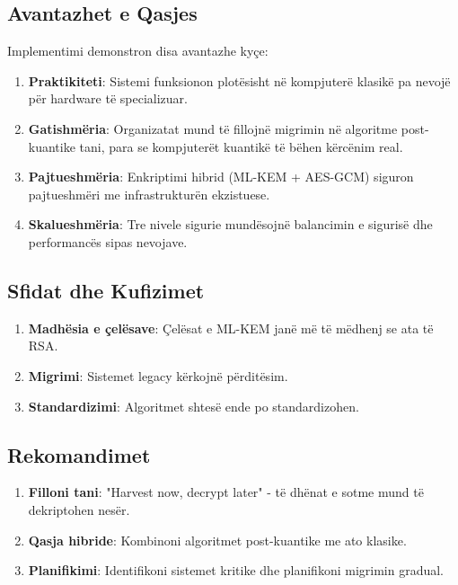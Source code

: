 \documentclass[conference]{IEEEtran}
\begin{document}
\subsection{Avantazhet e Qasjes}

Implementimi demonstron disa avantazhe kyçe:

\begin{enumerate}
\item \textbf{Praktikiteti}: Sistemi funksionon plotësisht në kompjuterë klasikë pa nevojë për hardware të specializuar.

\item \textbf{Gatishmëria}: Organizatat mund të fillojnë migrimin në algoritme post-kuantike tani, para se kompjuterët kuantikë të bëhen kërcënim real.

\item \textbf{Pajtueshmëria}: Enkriptimi hibrid (ML-KEM + AES-GCM) siguron pajtueshmëri me infrastrukturën ekzistuese.

\item \textbf{Skalueshmëria}: Tre nivele sigurie mundësojnë balancimin e sigurisë dhe performancës sipas nevojave.
\end{enumerate}

\subsection{Sfidat dhe Kufizimet}

\begin{enumerate}
\item \textbf{Madhësia e çelësave}: Çelësat e ML-KEM janë më të mëdhenj se ata të RSA.
\item \textbf{Migrimi}: Sistemet legacy kërkojnë përditësim.
\item \textbf{Standardizimi}: Algoritmet shtesë ende po standardizohen.
\end{enumerate}

\subsection{Rekomandimet}

\begin{enumerate}
\item \textbf{Filloni tani}: "Harvest now, decrypt later" - të dhënat e sotme mund të dekriptohen nesër.
\item \textbf{Qasja hibride}: Kombinoni algoritmet post-kuantike me ato klasike.
\item \textbf{Planifikimi}: Identifikoni sistemet kritike dhe planifikoni migrimin gradual.
\end{enumerate}
\end{document}
